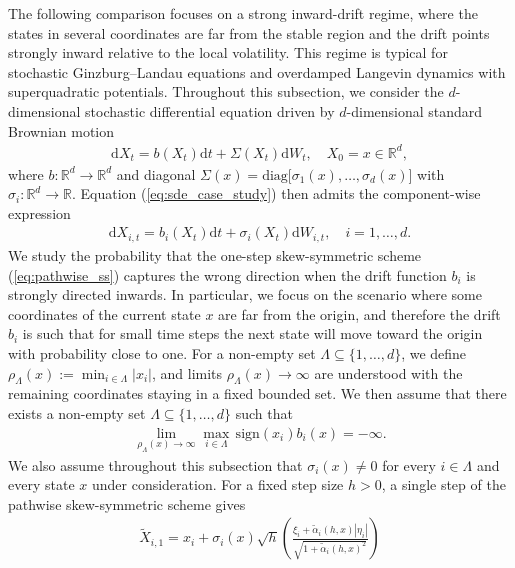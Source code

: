 \documentclass[11pt]{article}
\renewcommand{\d}{\mathrm{d}}
\begin{document}
The following comparison focuses on a strong inward-drift regime, where the states in several coordinates are far from the stable region and the drift points strongly inward relative to the local volatility. This regime is typical for stochastic Ginzburg--Landau equations and overdamped Langevin dynamics with superquadratic potentials. Throughout this subsection, we consider the $d$-dimensional stochastic differential equation driven by $d$-dimensional standard Brownian motion 
% 
\begin{align} \label{eq:sde_case_study}
\d X_t = b (X_t) \d t + \Sigma (X_t) \d W_t, \quad X_0 = x \in \mathbb{R}^d, 
\end{align}
% 
where $b : \mathbb{R}^d \to \mathbb{R}^d$ and diagonal $\Sigma (x) = \mathrm{diag} \bigl[ \sigma_1 (x), \ldots, \sigma_d (x) \bigr]$ with $\sigma_i : \mathbb{R}^d \to \mathbb{R}$. Equation (\ref{eq:sde_case_study}) then admits the component-wise expression
% 
\begin{align} 
\d X_{i,t} = b_{i} (X_{t}) \d t + \sigma_i  (X_t) \d W_{i, t}, \quad i = 1, \ldots, d.   
\end{align}
%  
We study the probability that the one-step skew-symmetric scheme (\ref{eq:pathwise_ss}) captures the wrong direction when the drift function $b_i$ is strongly directed inwards. In particular, we focus on the scenario where some coordinates of the current state $x$ are far from the origin, and therefore the drift $b_i$ is such that for small time steps the next state will move toward the origin with probability close to one. 
For a non-empty set $\Lambda \subseteq \{1, \ldots, d\}$, we define $\rho_ {\Lambda} (x) := \min_{i \in \Lambda} |x_i|$, and limits  $\rho_{\Lambda} (x) \to  \infty$ are understood with the remaining coordinates staying in a fixed bounded set. We then assume that there exists a non-empty set $\Lambda \subseteq \{1, \ldots, d\}$ such that 
% 
\begin{align} 
\label{eq:drift_inward}
\displaystyle 
\lim_{\rho_{\Lambda} (x) \to \infty} \max_{i \in \Lambda} \, 
\mathrm{sign} (x_i) b_i (x) = - \infty.  
\end{align}  
% 
We also assume throughout this subsection that $\sigma_i(x)\neq0$ for every $i\in\Lambda$ and every state $x$ under consideration.  For a fixed step size $h > 0$, a single step of the pathwise skew-symmetric scheme gives
% 
\begin{align} \label{eq:ss_one_step}
\widetilde{X}_{i, 1}
= x_i +  \sigma_i (x) \sqrt{h} \left( \frac{\xi_i + \tilde{\alpha}_i (h, x) |\eta_i|}{\sqrt{1 + \tilde{\alpha}_i (h, x)^2}} 
\right)
\end{align}
\end{document}
